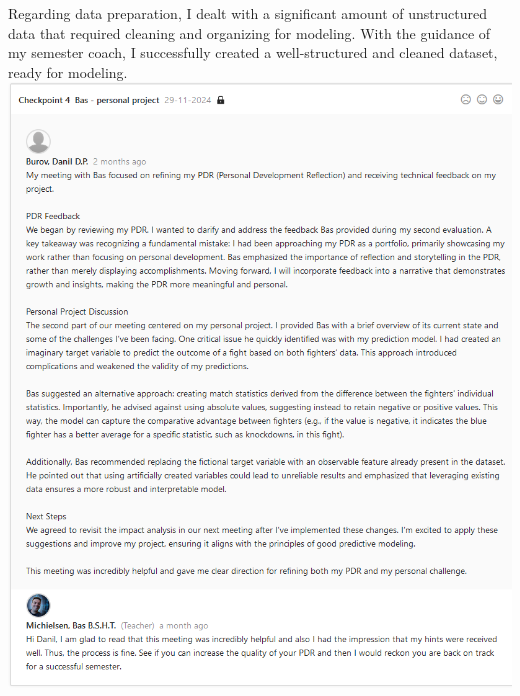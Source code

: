 \documentclass{article}
\begin{document}
	Regarding data preparation, I dealt with a significant amount of unstructured data that required cleaning and organizing for modeling. With the guidance of my semester coach, I successfully created a well-structured and cleaned dataset, ready for modeling.\\
	  \includegraphics[width=\textwidth]{images/Feedback_Bas_1.png}\\
	
\end{document}
